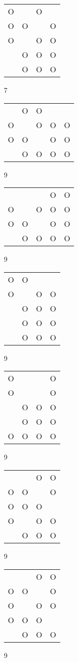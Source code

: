 \begin{tabular}{|m{0.2cm}m{0.2cm}m{0.2cm}m{0.2cm}|}\hline
O& &O& \\
O&O& &O\\
O& &O&O\\
 &O&O&O\\
 &O&O&O\\
\hline\end{tabular}7
\begin{tabular}{|m{0.2cm}m{0.2cm}m{0.2cm}m{0.2cm}m{0.2cm}|}\hline
 &O&O& & \\
O& &O&O&O\\
O&O& &O&O\\
 &O&O&O&O\\
\hline\end{tabular}9
\begin{tabular}{|m{0.2cm}m{0.2cm}m{0.2cm}m{0.2cm}m{0.2cm}|}\hline
 & & &O&O\\
O& &O&O&O\\
O&O& &O&O\\
 &O&O&O&O\\
\hline\end{tabular}9
\begin{tabular}{|m{0.2cm}m{0.2cm}m{0.2cm}m{0.2cm}|}\hline
O&O& & \\
O& &O&O\\
 &O&O&O\\
 &O&O&O\\
 &O&O&O\\
\hline\end{tabular}9
\begin{tabular}{|m{0.2cm}m{0.2cm}m{0.2cm}m{0.2cm}|}\hline
O& & &O\\
O& & &O\\
 &O&O&O\\
 &O&O&O\\
O&O&O&O\\
\hline\end{tabular}9
\begin{tabular}{|m{0.2cm}m{0.2cm}m{0.2cm}m{0.2cm}|}\hline
 & &O&O\\
O&O& &O\\
O&O&O& \\
O& &O&O\\
 &O&O&O\\
\hline\end{tabular}9
\begin{tabular}{|m{0.2cm}m{0.2cm}m{0.2cm}m{0.2cm}|}\hline
 & &O&O\\
O&O& &O\\
O& &O&O\\
O&O&O& \\
 &O&O&O\\
\hline\end{tabular}9
